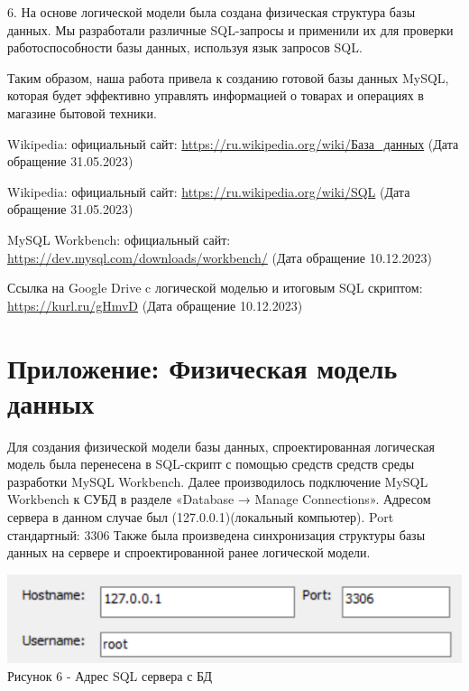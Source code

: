 \documentclass[14pt]{extreport}
\begin{document}
6. На основе логической модели была создана физическая структура базы данных. Мы разработали различные SQL-запросы и применили их для проверки работоспособности базы данных, используя язык запросов SQL.

Таким образом, наша работа привела к созданию готовой базы данных MySQL, которая будет эффективно управлять информацией о товарах и операциях в магазине бытовой техники.


\begin{thebibliography}

 Wikipedia: официальный сайт: 
\url{https://ru.wikipedia.org/wiki/База_данных} (Дата обращение 31.05.2023)

 Wikipedia: официальный сайт: \url{https://ru.wikipedia.org/wiki/SQL} (Дата обращение 31.05.2023)

 MySQL Workbench: официальный сайт: \url{https://dev.mysql.com/downloads/workbench/} (Дата обращение 10.12.2023)

 Ссылка на Google Drive c логической моделью и итоговым SQL скриптом: \url{https://kurl.ru/gHmvD} (Дата обращение 10.12.2023)

\end{thebibliography}

\chapter{Приложение: Физическая модель данных}
Для создания физической модели базы данных, спроектированная
логическая модель была перенесена в SQL-скрипт с помощью средств средств
среды разработки MySQL Workbench. Далее производилось подключение MySQL Workbench к СУБД в разделе «Database → Manage Connections».
Адресом сервера в данном случае был (127.0.0.1)(локальный компьютер). Port стандартный: 3306
Также была произведена синхронизация структуры базы данных на сервере и спроектированной ранее логической модели.


\begin{center}
    \centering
    \includegraphics[width=0.8\linewidth]{host.png}
    \\Рисунок 6 - Адрес SQL сервера с БД
\end{center} 
\end{document}
